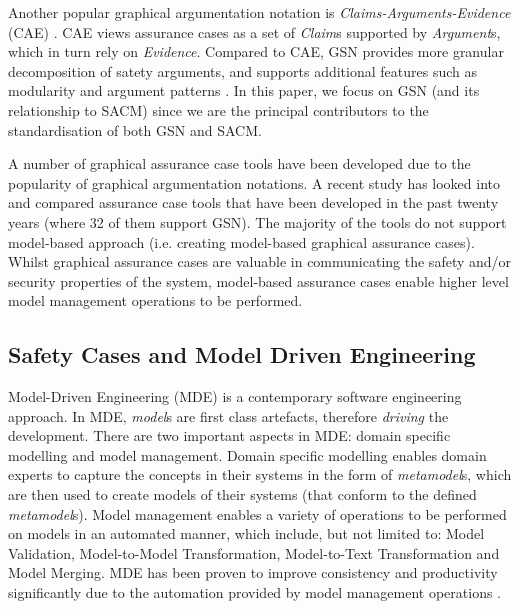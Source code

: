 Another popular graphical argumentation notation is \textit{Claims-Arguments-Evidence} (CAE) \cite{bishop2000methodology}. 
CAE views assurance cases as a set of \textit{Claim}s supported by \textit{Argument}s, which in turn rely on \textit{Evidence}.
Compared to CAE, 
GSN provides more granular decomposition of satety arguments, and supports additional features such as modularity and argument patterns \cite{kelly2005costs}.
In this paper, we focus on GSN (and its relationship to SACM) since we are the principal contributors to the standardisation of both GSN and SACM.

A number of graphical assurance case tools have been developed due to the popularity of graphical argumentation notations. 
A recent study \cite{maksimov2018} has looked into and compared assurance case tools that have been developed in the past twenty years (where 32 of them support GSN). 
The majority of the tools do not support model-based approach (i.e. creating model-based graphical assurance cases).
Whilst graphical assurance cases are valuable in communicating the safety and/or security properties of the system, model-based assurance cases enable higher level model management operations to be performed.

\subsection{Safety Cases and Model Driven Engineering}
Model-Driven Engineering (MDE) is a contemporary software engineering approach. 
In MDE, \textit{model}s are first class artefacts, therefore \textit{driving} the development. 
There are two important aspects in MDE: domain specific modelling and model management. 
Domain specific modelling enables domain experts to capture the concepts in their systems in the form of \textit{metamodel}s, which are then used to create models of their systems (that conform to the defined \textit{metamodel}s). 
Model management enables a variety of operations to be performed on models in an automated manner, which include, but not limited to: Model Validation, Model-to-Model Transformation, Model-to-Text Transformation and Model Merging.
MDE has been proven to improve consistency and productivity significantly due to the automation provided by model management operations \cite{jaaksi2002developing, karna2009evaluating}. 

